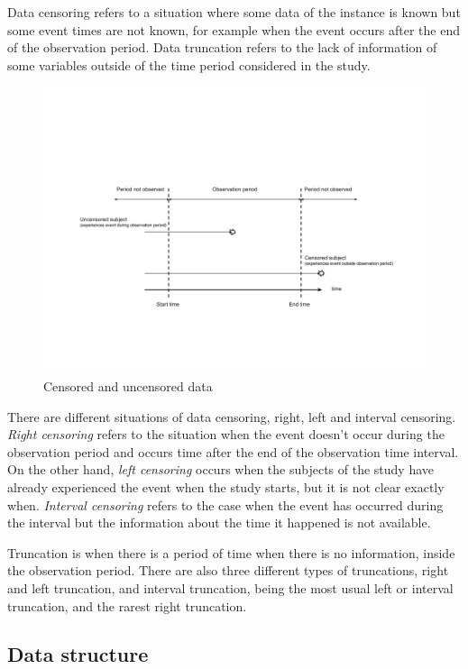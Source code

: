 \documentclass[11pt]{book} %
\begin{document}
      Data censoring refers to a situation where some data of the instance is known but some event times are not known, for example when the event occurs after the end of the observation period. Data truncation refers to the lack of information of some variables outside of the time period considered in the study.

      \begin{figure}[!ht]
        \includegraphics[width=\textwidth]{Data_censoring.png}
        \caption{Censored and uncensored data}
        \label{img:data_censoring}
      \end{figure}

      There are different situations of data censoring, right, left and interval censoring. \emph{Right censoring} refers to the situation when the event doesn't occur during the observation period and occurs time after the end of the observation time interval. On the other hand, \emph{left censoring} occurs when the subjects of the study have already experienced the event when the study starts, but it is not clear exactly when. \emph{Interval censoring} refers to the case when the event has occurred during the interval but the information about the time it happened is not available.

      Truncation is when there is a period of time when there is no information, inside the observation period. There are also three different types of truncations, right and left truncation, and interval truncation, being the most usual left or interval truncation, and the rarest right truncation.

    \subsection{Data structure}
\end{document}
